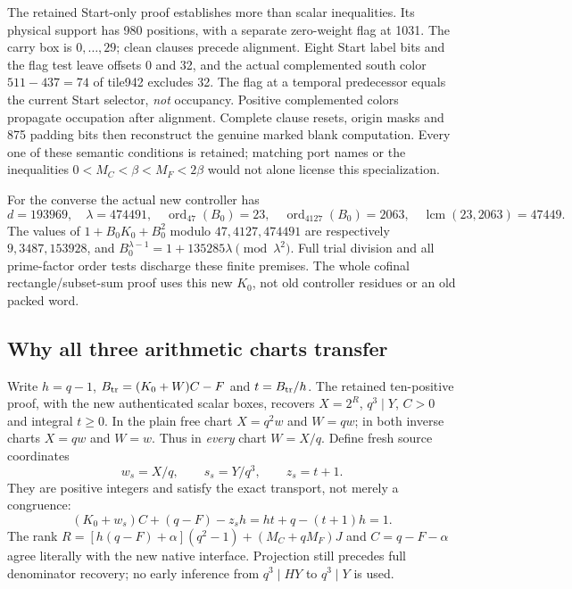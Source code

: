 The retained Start-only proof establishes more than scalar inequalities.
Its physical support has 980 positions, with a separate zero-weight flag at 1031.
The carry box is $0,\ldots,29$; clean clauses precede alignment. Eight Start
label bits and the flag test leave offsets 0 and 32, and the actual complemented
south color $511-437=74$ of tile942 excludes 32. The flag at a temporal
predecessor equals the current Start selector, \emph{not} occupancy.
Positive complemented colors propagate occupation after alignment. Complete
clause resets, origin masks and 875 padding bits then reconstruct the genuine
marked blank computation. Every one of these semantic conditions is retained;
matching port names or the inequalities $0<M_C<\beta<M_F<2\beta$ would not
alone license this specialization.

For the converse the actual new controller has
\[
 d=193969,\quad\lambda=474491,\quad
 \operatorname{ord}_{47}(B_0)=23,\quad
 \operatorname{ord}_{4127}(B_0)=2063,
 \quad\operatorname{lcm}(23,2063)=47449.
\]
The values of $1+B_0K_0+B_0^2$ modulo $47,4127,474491$ are respectively
$9,3487,153928$, and
$B_0^{\lambda-1}=1+135285\lambda\pmod{\lambda^2}$.
Full trial division and all prime-factor order tests discharge these finite
premises. The whole cofinal rectangle/subset-sum proof uses this new $K_0$,
not old controller residues or an old packed word.

\subsection{Why all three arithmetic charts transfer}
Write $h=q-1$, $B_{\rm tr}=(K_0+W)C-F$ and $t=B_{\rm tr}/h$.
The retained ten-positive proof, with the new authenticated scalar boxes,
recovers $X=2^R$, $q^3\mid Y$, $C>0$ and integral $t\geq0$.
In the plain free chart $X=q^2w$ and $W=qw$; in both inverse charts
$X=qw$ and $W=w$. Thus in \emph{every} chart $W=X/q$.
Define fresh source coordinates
\[
 w_s=X/q,\qquad s_s=Y/q^3,\qquad z_s=t+1.
\]
They are positive integers and satisfy the exact transport, not merely a
congruence:
\[
 (K_0+w_s)C+(q-F)-z_sh
 =ht+q-(t+1)h=1.
\]
The rank $R=[h(q-F)+\alpha](q^2-1)+(M_C+qM_F)J$ and
$C=q-F-\alpha$ agree literally with the new native interface.
Projection still precedes full denominator recovery; no early inference
from $q^3\mid HY$ to $q^3\mid Y$ is used.

